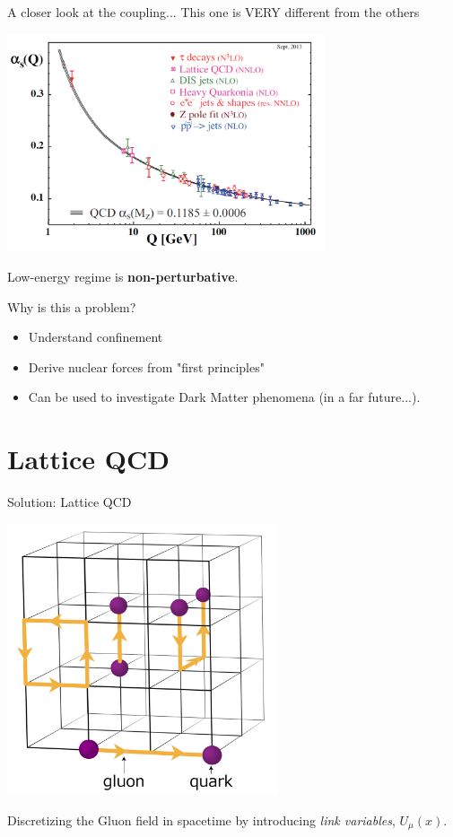 \documentclass[10pt]{beamer}
\begin{document}
\begin{frame}{A closer look at the coupling...}
	This one is VERY different from the others
	\begin{center}
		\includegraphics[width=0.7\textwidth]{figures/qcd_coupling.png}
	\end{center}
	Low-energy regime is \textbf{non-perturbative}.
\end{frame}

\begin{frame}{Why is this a problem?}
	\begin{itemize}
		\item Understand confinement
		\item Derive nuclear forces from "first principles"
		\item Can be used to investigate Dark Matter phenomena (in a far future...).
	\end{itemize}
\end{frame}

\section{Lattice QCD}

\begin{frame}{Solution: Lattice QCD}
	\begin{center}
		\includegraphics[width=0.6\textwidth]{figures/LatticeQCD.png}
	\end{center}

	Discretizing the Gluon field in spacetime by introducing \textit{link variables}, $U_\mu(x)$.
\end{frame}
\end{document}
